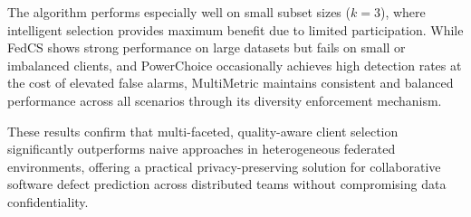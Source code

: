 The algorithm performs especially well on small subset sizes ($k=3$), where intelligent selection provides maximum benefit due to limited participation. While FedCS shows strong performance on large datasets but fails on small or imbalanced clients, and PowerChoice occasionally achieves high detection rates at the cost of elevated false alarms, MultiMetric maintains consistent and balanced performance across all scenarios through its diversity enforcement mechanism.

These results confirm that multi-faceted, quality-aware client selection significantly outperforms naive approaches in heterogeneous federated environments, offering a practical privacy-preserving solution for collaborative software defect prediction across distributed teams without compromising data confidentiality.
